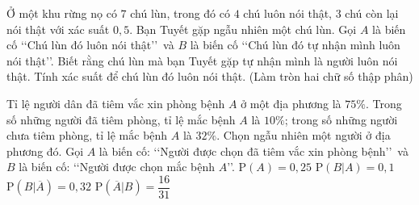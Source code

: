 \begin{ex}%
	Ở một khu rừng nọ có $7$ chú lùn, trong đó có $4$ chú luôn nói thật, $3$ chú còn lại nói thật với xác suất $0{,}5$. Bạn Tuyết gặp ngẫu nhiên một chú lùn. Gọi $A$ là biến cố \lq\lq Chú lùn đó luôn nói thật\rq\rq\, và $B$ là biến cố \lq\lq Chú lùn đó tự nhận mình luôn nói thật\rq\rq. Biết rằng chú lùn mà bạn Tuyết gặp tự nhận mình là người luôn nói thật. Tính xác suất để chú lùn đó luôn nói thật. (Làm tròn hai chữ số thập phân)
\end{ex}

\begin{ex}%
Tỉ lệ người dân đã tiêm vắc xin phòng bệnh $A$ ở một địa phương là $75\%$. Trong số những người đã tiêm phòng, tỉ lệ mắc bệnh $A$ là $10\%$; trong số những người chưa tiêm phòng, tỉ lệ mắc bệnh $A$ là $32\%$. Chọn ngẫu nhiên một người ở địa phương đó. Gọi $A$ là biến cố: \lq\lq Người được chọn đã tiêm vắc xin phòng bệnh\rq\rq \, và $B$ là biến cố: \lq\lq Người được chọn mắc bệnh $A$\rq\rq.
\choiceTF
{ $\mathrm{P}(A)=0{,}25$}
{\True $\mathrm{P}\left(B|A\right)=0{,}1$}
{\True $\mathrm{P}\left(B|\overline{A}\right)=0{,}32$}
{ \True $\mathrm{P}\left(\overline{A}|B\right)=\dfrac{16}{31}$}
\end{ex}

